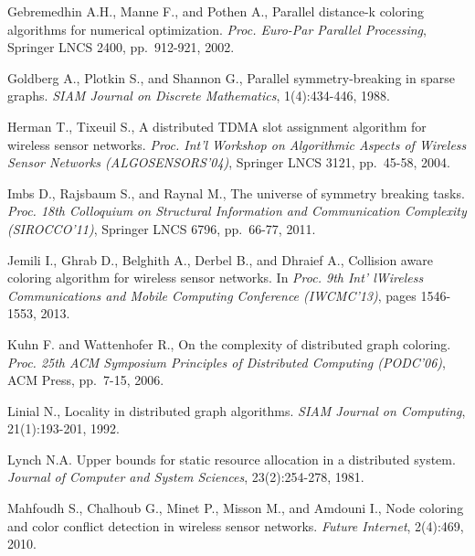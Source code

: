 \documentclass[11pt,english]{article}
\begin{document}
\begin{thebibliography}{99}
{\vspace{-0.1cm}
Gebremedhin A.H.,   Manne F., and  Pothen A., 
Parallel distance-k coloring algorithms for numerical optimization.
{\it Proc. Euro-Par  Parallel Processing}, 
Springer LNCS 2400,  pp.~912-921, 2002.  


\vspace{-0.1cm}
Goldberg A.,  Plotkin S.,  and Shannon G., 
Parallel symmetry-breaking in sparse graphs.
{\it SIAM Journal on Discrete Mathematics}, 1(4):434-446, 1988.

\vspace{-0.1cm}
Herman T., Tixeuil S., 
A distributed TDMA slot assignment algorithm for wireless sensor networks.
{\it Proc. Int'l Workshop on Algorithmic Aspects of Wireless Sensor Networks
(ALGOSENSORS'04)}, Springer LNCS 3121, pp.~45-58, 2004. 

\vspace{-0.1cm}
Imbs D., Rajsbaum S., and Raynal M., 
The universe of symmetry breaking tasks. 
{\it Proc.  18th  Colloquium on  Structural Information and Communication
Complexity  (SIROCCO'11)},  Springer LNCS 6796, pp.~66-77, 2011.

\vspace{-0.1cm}
Jemili I., Ghrab D., Belghith A., Derbel B., and Dhraief A., 
Collision aware coloring algorithm for wireless sensor networks.
In {\it  Proc. 9th Int' lWireless Communications and Mobile Computing 
Conference  (IWCMC'13)}, pages 1546-1553,  2013.




\vspace{-0.1cm}
Kuhn F.  and  Wattenhofer R., 
On the complexity of distributed graph coloring.
{\it  Proc. 25th ACM Symposium  Principles of Distributed Computing (PODC'06)},
ACM Press, pp.~7-15, 2006.


\vspace{-0.1cm}
Linial N.,
Locality in distributed graph algorithms.
{\it SIAM Journal on Computing}, 21(1):193-201, 1992. 

\vspace{-0.1cm}
Lynch N.A. 
Upper bounds for static resource allocation in a distributed system.
{\it Journal of Computer and System Sciences},
23(2):254-278, 1981.





Mahfoudh S., Chalhoub G., Minet P., Misson M., and Amdouni  I.,
Node coloring and color conflict detection in wireless sensor networks. 
{\it Future Internet}, 2(4):469, 2010.


}
\end{thebibliography}
\end{document}
